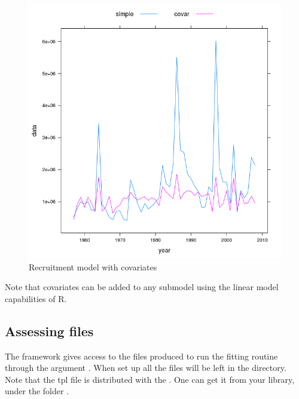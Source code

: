 \documentclass[a4paper,english,10pt]{article}\usepackage[]{graphicx}\usepackage[]{color}
\makeatletter
\def\maxwidth{ %
  \ifdim\Gin@nat@width>\linewidth
    \linewidth
  \else
    \Gin@nat@width
  \fi
}
\newenvironment{knitrout}{}{} %
\makeatother
\begin{document}
\begin{knitrout}
\color{fgcolor}\begin{figure}[H]

{\centering \includegraphics[width=\maxwidth]{figure/naor2-1} 

}

\caption[Recruitment model with covariates]{Recruitment model with covariates}\label{fig:naor2}
\end{figure}


\end{knitrout}

Note that covariates can be added to any submodel using the linear model capabilities of R.

\subsection{Assessing  files}

The framework gives access to the files produced to run the  fitting routine through the argument . When set up all the  files will be left in the directory. Note that the  tpl file is distributed with the . One can get it from your  library, under the folder .
\end{document}
